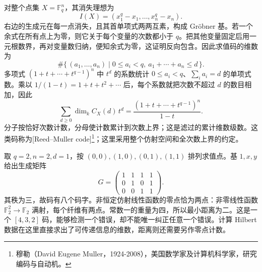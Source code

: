 对整个点集 \(X=\mathbb F_q^n\)，其消失理想为
\[
	I(X)=(x_1^q-x_1,\ldots,x_n^q-x_n).
\]
右边的生成元在每一点消失，且其首单项式两两互素，构成 Gröbner 基。若一个余式在所有点上为零，则它关于每个变量的次数都小于 \(q\)。把其他变量固定后用一元根数界，再对变量数归纳，便知余式为零，这证明反向包含。因此求值码的维数为
\[
	\#\{\,(a_1,\ldots,a_n)\mid 0\le a_i<q,\ a_1+\cdots+a_n\le d\,\}.
\]
多项式 \((1+t+\cdots+t^{q-1})^n\) 中 \(t^d\) 的系数统计 \(0\le a_i<q\)、\(\sum_i a_i=d\) 的单项式数。乘以 \(1/(1-t)=1+t+t^2+\cdots\) 后，每个系数就把次数不超过 \(d\) 的数目相加，因此
\[
	\sum_{d\ge0}\dim_k C_X(d)\,t^d =\frac{(1+t+\cdots+t^{q-1})^n}{1-t}.
\]
分子按恰好次数计数，分母使计数累计到次数上界；这是滤过的累计维数级数。这类码称为[Reed--Muller code]\footnote{穆勒（David Eugene Muller，1924-2008），美国数学家及计算机科学家，研究编码与自动机。}；这里采用整个仿射空间和全次数上界的约定。

\ProseParagraphBreak
取 \(q=2,n=2,d=1\)，按 \((0,0),(1,0),(0,1),(1,1)\) 排列求值点。基 \(1,x,y\) 给出生成矩阵
\[
	G=\begin{pmatrix}1&1&1&1\\0&1&0&1\\0&0&1&1\end{pmatrix}.
\]
其秩为三，故码有八个码字。非恒定仿射线性函数的零点恰为两点：非零线性函数 \(\mathbb F_2^2\to\mathbb F_2\) 满射，每个纤维有两点。常数一的重量为四，所以最小距离为二。这是一个 \([4,3,2]\) 码，能够检测一个错误，却不能唯一纠正任意一个错误。计算 Hilbert 数据在这里直接求出了可传递信息的维数，距离则还需要另作零点计数。
